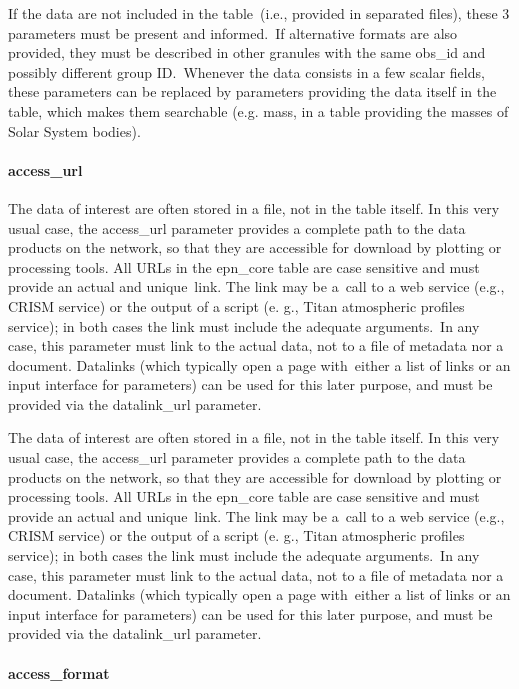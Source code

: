 \documentclass[11pt,a4paper]{ivoa}
\begin{document}
If the data are not included in the table (i.e., provided in separated files), these 3 parameters must be present and informed. If alternative formats are also provided, they must be described in other granules with the same obs\_id and possibly different group ID. Whenever the data consists in a few scalar fields, these parameters can be replaced by parameters providing the data itself in the table, which makes them searchable (e.g. mass, in a table providing the masses of Solar System bodies).

\paragraph{access\_url}

The data of interest are often stored in a file, not in the table itself. In this very usual case, the access\_url parameter provides a complete path to the data products on the network, so that they are accessible for download by plotting or processing tools. All URLs in the epn\_core table are case sensitive and must provide an actual and unique link. The link may be a call to a web service (e.g., CRISM service) or the output of a script (e. g., Titan atmospheric profiles service); in both cases the link must include the adequate arguments. In any case, this parameter must link to the actual data, not to a file of metadata nor a document. Datalinks (which typically open a page with either a list of links or an input interface for parameters) can be used for this later purpose, and must be provided via the datalink\_url parameter. 

The data of interest are often stored in a file, not in the table itself. In this very usual case, the access\_url parameter provides a complete path to the data products on the network, so that they are accessible for download by plotting or processing tools. All URLs in the epn\_core table are case sensitive and must provide an actual and unique link. The link may be a call to a web service (e.g., CRISM service) or the output of a script (e. g., Titan atmospheric profiles service); in both cases the link must include the adequate arguments. In any case, this parameter must link to the actual data, not to a file of metadata nor a document. Datalinks (which typically open a page with either a list of links or an input interface for parameters) can be used for this later purpose, and must be provided via the datalink\_url parameter. 

\paragraph{access\_format}
\end{document}
